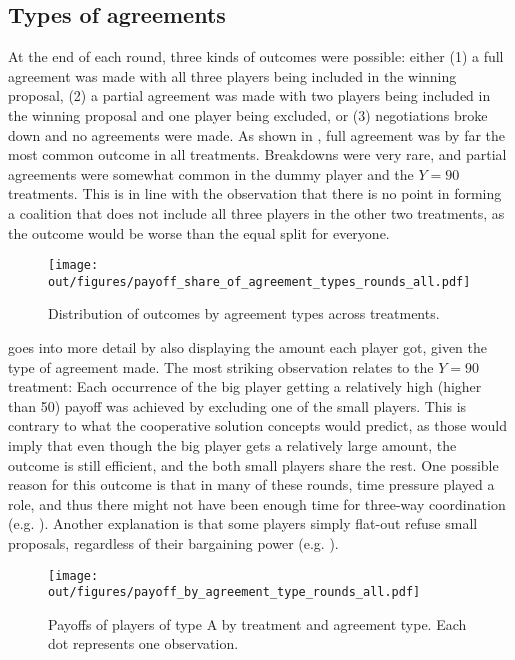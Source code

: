 \subsection{Types of agreements}

At the end of each round, three kinds of outcomes were possible: either (1) a full agreement was made with all three players being included in the winning proposal, (2) a partial agreement was made with two players being included in the winning proposal and one player being excluded, or (3) negotiations broke down and no agreements were made. As shown in , full agreement was by far the most common outcome in all treatments. Breakdowns were very rare, and partial agreements were somewhat common in the dummy player and the $Y=90$ treatments. This is in line with the observation that there is no point in forming a coalition that does not include all three players in the other two treatments, as the outcome would be worse than the equal split for everyone.

\begin{figure}
    \centering
    \texttt{[image: out/figures/payoff\_share\_of\_agreement\_types\_rounds\_all.pdf]}
    \caption{Distribution of outcomes by agreement types across treatments.}
    \label{fig:agreement_types}
\end{figure}

 goes into more detail by also displaying the amount each player got, given the type of agreement made. The most striking observation relates to the $Y=90$ treatment: Each occurrence of the big player getting a relatively high (higher than 50) payoff was achieved by excluding one of the small players. This is contrary to what the cooperative solution concepts would predict, as those would imply that even though the big player gets a relatively large amount, the outcome is still efficient, and the both small players share the rest. One possible reason for this outcome is that in many of these rounds, time pressure played a role, and thus there might not have been enough time for three-way coordination (e.g. ). Another explanation is that some players simply flat-out refuse small proposals, regardless of their bargaining power (e.g. ).

\begin{figure}
    \centering
    \texttt{[image: out/figures/payoff\_by\_agreement\_type\_rounds\_all.pdf]}
    \caption{Payoffs of players of type A by treatment and agreement type. Each dot represents one observation.}
    \label{fig:payoff_by_agreement}
\end{figure}

